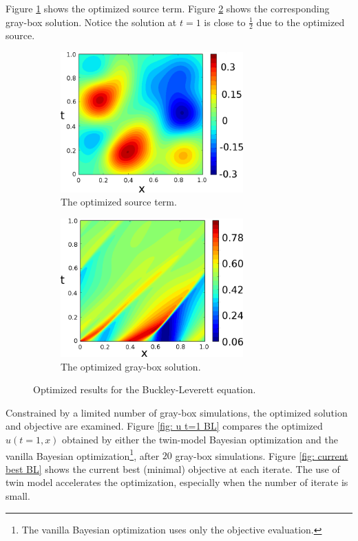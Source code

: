 Figure \ref{fig: opt BL source} shows the optimized source term.
Figure \ref{fig: opt BL sol} shows the corresponding gray-box solution. 
Notice the solution at $t=1$ is close to $\frac{1}{2}$ due to the optimized source.
\begin{figure}[htbp]\begin{center}
    \begin{subfigure}[t]{.49\textwidth}
        \centering
        \includegraphics[width=7cm]{../opt_source.png}
        \caption{The optimized source term.}
        \label{fig: opt BL source}
    \end{subfigure}
    \begin{subfigure}[t]{.49\textwidth}     
        \centering
        \includegraphics[width=7cm]{../LD_utx.png}
        \caption{The optimized gray-box solution.}
        \label{fig: opt BL sol}
    \end{subfigure}
    \caption{Optimized results for the Buckley-Leverett equation.}
    \label{fig: opt BL results}
\end{center}\end{figure}

Constrained by a limited number of gray-box simulations,
the optimized solution and objective are examined.
Figure \ref{fig: u t=1 BL} 
compares the optimized $u(t=1,x)$ obtained by either the twin-model Bayesian optimization 
and the vanilla Bayesian optimization\footnote{The vanilla Bayesian optimization uses
only the objective evaluation.}, after $20$ gray-box simulations. 
Figure \ref{fig: current best BL} shows the current best (minimal) objective at
each iterate. The use of twin model accelerates the optimization, especially when 
the number of iterate is small.

